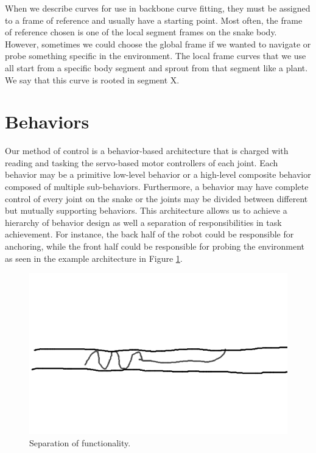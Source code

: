 When we describe curves for use in backbone curve fitting, they must be assigned to a frame of reference and usually have a starting point.  Most often, the frame of reference chosen is one of the local segment frames on the snake body.  However, sometimes we could choose the global frame if we wanted to navigate or probe something specific in the environment.  The local frame curves that we use all start from a specific body segment and sprout from that segment like a plant.  We say that this curve is rooted in segment X. 


\section{Behaviors}

Our method of control is a behavior-based architecture that is charged with reading and tasking the servo-based motor controllers of each joint.  Each behavior may be a primitive low-level behavior or a high-level composite behavior composed of multiple sub-behaviors.  Furthermore, a behavior may have complete control of every joint on the snake or the joints may be divided between different but mutually supporting behaviors.  This architecture allows us to achieve a hierarchy of behavior design as well a separation of responsibilities in task achievement.  For instance, the back half of the robot could be responsible for anchoring, while the front half could be responsible for probing the environment as seen in the example architecture in Figure \ref{behaviors1}.

\begin{figure}
\begin{center}
\includegraphics[scale=0.5]{2_behaviors_1.png}
\end{center}
\caption{Separation of functionality.}
\label{behaviors1}
\end{figure}

